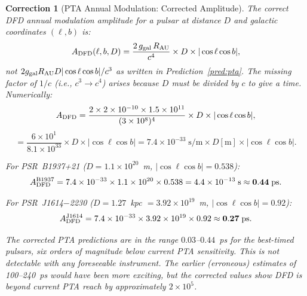 \documentclass[aps,prd,twocolumn,superscriptaddress,nofootinbib]{revtex4-2}
\newtheorem{correction}{Correction}
\begin{document}
\begin{correction}[PTA Annual Modulation: Corrected Amplitude]
The correct DFD annual modulation amplitude for a pulsar at distance $D$
and galactic coordinates $(\ell, b)$ is:
\begin{equation}
A_{\rm DFD}(\ell,b,D)
= \frac{2\,g_{\rm gal}\,R_{\rm AU}}{c^4}
  \times D\times|\cos\ell\cos b|,
\label{eq:pta_amplitude_corrected}
\end{equation}
\emph{not} $2g_{\rm gal}R_{\rm AU}D|\cos\ell\cos b|/c^3$ as written in
Prediction~\ref{pred:pta}. The missing factor of $1/c$ (i.e., $c^3 \to c^4$)
arises because $D$ must be divided by $c$ to give a time.
Numerically:
\begin{equation}
A_{\rm DFD} = \frac{2\times2\times10^{-10}\times1.5\times10^{11}}
{(3\times10^8)^4}\times D\times|\cos\ell\cos b|,
\end{equation}
\begin{equation}
= \frac{6\times10^{1}}{8.1\times10^{33}}
\times D\times|\cos\ell\cos b|
= 7.4\times10^{-33}\;\text{s/m}\times D[\text{m}]\times|\cos\ell\cos b|.
\end{equation}

For PSR~B1937+21 ($D = 1.1\times10^{20}$~m, $|\cos\ell\cos b| = 0.538$):
\begin{equation}
A_{\rm DFD}^{\rm B1937} = 7.4\times10^{-33}\times1.1\times10^{20}
\times0.538 = 4.4\times10^{-13}\;\text{s} \approx \mathbf{0.44\;\text{ps}}.
\end{equation}

For PSR~J1614$-$2230 ($D = 1.27$~kpc $= 3.92\times10^{19}$~m,
$|\cos\ell\cos b| = 0.92$):
\begin{equation}
A_{\rm DFD}^{\rm J1614} = 7.4\times10^{-33}\times3.92\times10^{19}
\times0.92 \approx \mathbf{0.27\;\text{ps}}.
\end{equation}

The corrected PTA predictions are in the range $0.03$--$0.44$~ps
for the best-timed pulsars, six orders of magnitude below current
PTA sensitivity. This is not detectable with any foreseeable
instrument. The earlier (erroneous) estimates of 100--240~ps would
have been more exciting, but the corrected values show DFD is
beyond current PTA reach by approximately $2\times10^5$.
\end{correction}
\end{document}
